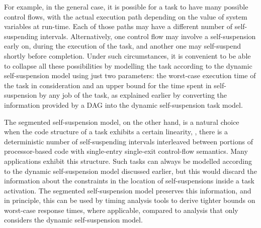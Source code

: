 For example, in the general case, it is possible for a task to have many possible control flows, with the actual execution path depending on the value
of system variables at run-time. Each of those paths may have a different
number of self-suspending intervals. Alternatively, one control flow may involve a self-suspension early on, during the execution of the task, and
another one may self-suspend shortly before completion. Under such circumstances, it is convenient to be able to collapse all these possibilities
by modelling the task according to the dynamic self-suspension model using
just two parameters: the worst-case execution time of the task in consideration and an upper bound for the time spent in self-suspension by any job of the task, as explained earlier by converting the information provided by a DAG into the dynamic self-suspension task model. 
  
The segmented self-suspension model, on the other hand, is a natural choice when the code structure of a task exhibits a certain linearity,
\ie, there is a deterministic number of self-suspending intervals interleaved between portions of processor-based code with single-entry
single-exit control-flow semantics. Many applications exhibit this structure. Such tasks can always be modelled according to the dynamic self-suspension
model discussed earlier, but this would discard the information about the constraints in the location of self-suspensions inside a task 
activation. The segmented self-suspension model preserves this information, and in principle, this can be used by timing analysis tools 
to derive tighter bounds on worst-case response times, where applicable, compared to analysis that only considers the dynamic self-suspension model. 




